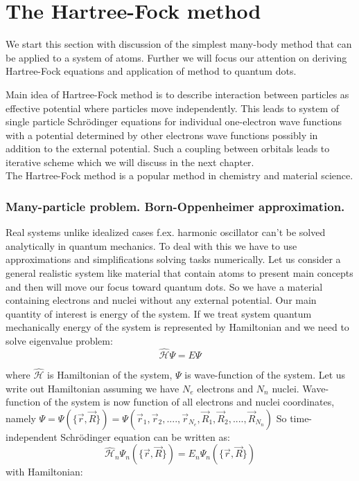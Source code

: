 \documentclass[10pt]{article}
\newcommand*{\hatH}{\hat{\mathcal{H}}}
\begin{document}
 

\newpage

\section{The Hartree-Fock method }\label{Part1}   %

We start this section with discussion of the simplest many-body method that can be applied to a system of atoms. Further we will focus our attention on deriving Hartree-Fock equations and application of method to quantum dots.

Main idea of Hartree-Fock method is to describe interaction between particles as effective potential where particles move independently. This leads to system of single particle Schr\"{o}dinger equations for individual one-electron wave functions with a potential determined by other electrons wave functions possibly in addition to the external potential. Such a coupling between orbitals leads to iterative scheme which we will discuss in the next chapter. \\
  The Hartree-Fock method is a popular method in chemistry and material science. 



\subsubsection{Many-particle problem. Born-Oppenheimer approximation.}

Real systems unlike idealized cases f.ex. harmonic oscillator can't be solved analytically in quantum mechanics.
To deal with this we have to use approximations and simplifications solving tasks numerically.
Let us consider a general realistic system like material that contain atoms to present main concepts and then will move our focus toward quantum dots.
So we have a material containing electrons and nuclei without any external potential.
Our main quantity of interest is energy of the system. If we treat system quantum mechanically energy of the system is represented by Hamiltonian and we need to solve eigenvalue problem:
\[
\hatH\Psi = E\Psi
\]

where $\hatH$ is Hamiltonian of the system, $\Psi$ is wave-function of the system.
Let us write out Hamiltonian assuming we have $N_e$ electrons and $N_n$ nuclei. Wave-function of the system is now function of all electrons and nuclei coordinates, namely $\Psi=\Psi(\{\vec{r}, \vec{R}\}) = \Psi(\vec{r}_1, \vec{r}_2, ...., \vec{r}_{N_e}, \vec{R}_1, \vec{R}_2, ...., \vec{R}_{N_n})$
So time-independent Schr\"{o}dinger equation can be written as:
\[
\hatH_n\Psi_n(\{\vec{r}, \vec{R}\}) = E_n\Psi_n(\{\vec{r}, \vec{R}\})
\]
with Hamiltonian:
\end{document}
